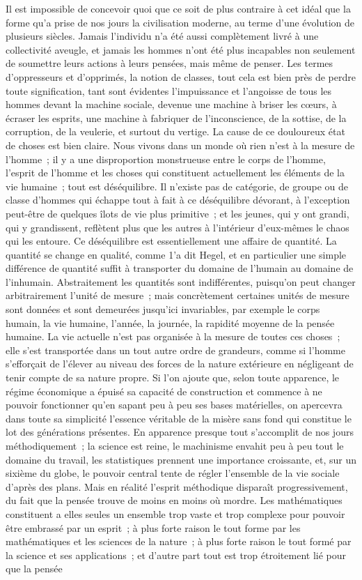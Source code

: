 \documentclass[french,twoside]{book} %
\begin{document}
\noindent Il est impossible de concevoir quoi que ce soit de plus contraire à cet idéal que la forme qu'a prise de nos jours la civilisation moderne, au terme d'une évolution de plusieurs siècles. Jamais l'individu n'a été aussi complètement livré à une collectivité aveugle, et jamais les hommes n'ont été plus incapables non seulement de soumettre leurs actions à leurs pensées, mais même de penser. Les termes d'oppresseurs et d'opprimés, la notion de classes, tout cela est bien près de perdre toute signification, tant sont évidentes l'impuissance et l'angoisse de tous les hommes devant la machine sociale, devenue une machine à briser les cœurs, à écraser les esprits, une machine à fabriquer de l'inconscience, de la sottise, de la corruption, de la veulerie, et surtout du vertige. La cause de ce douloureux état de choses est bien claire. Nous vivons dans un monde où rien n'est à la mesure de l'homme ; il y a une disproportion monstrueuse entre le corps de l'homme, l'esprit de l'homme et les choses qui constituent actuellement les éléments de la vie humaine ; tout est déséquilibre. Il n'existe pas de catégorie, de groupe ou de classe d'hommes qui échappe tout à fait à ce déséquilibre dévorant, à l'exception peut-être de quelques îlots de vie plus primitive ; et les jeunes, qui y ont grandi, qui y grandissent, reflètent plus que les autres à l'intérieur d'eux-mêmes le chaos qui les entoure. Ce déséquilibre est essentiellement une affaire de quantité. La quantité se change en qualité, comme 1’a dit Hegel, et en particulier une simple différence de quantité suffit à transporter du domaine de l'humain au domaine de l'inhumain. Abstraitement les quantités sont indifférentes, puisqu'on peut changer arbitrairement l'unité de mesure ; mais concrètement certaines unités de mesure sont données et sont demeurées jusqu'ici invariables, par exemple le corps humain, la vie humaine, l'année, la journée, la rapidité moyenne de la pensée humaine. La vie actuelle n'est pas organisée à la mesure de toutes ces choses ; elle s'est transportée dans un tout autre ordre de grandeurs, comme si l'homme s'efforçait de l'élever au niveau des forces de la nature extérieure en négligeant de tenir compte de sa nature propre. Si l'on ajoute que, selon toute apparence, le régime économique a épuisé sa capacité de construction et commence à ne pouvoir fonctionner qu'en sapant peu à peu ses bases matérielles, on apercevra dans toute sa simplicité l'essence véritable de la misère sans fond qui constitue le lot des générations présentes. En apparence presque tout s'accomplit de nos jours méthodiquement ; la science est reine, le machinisme envahit peu à peu tout le domaine du travail, les statistiques prennent une importance croissante, et, sur un sixième du globe, le pouvoir central tente de régler l'ensemble de la vie sociale d'après des plans. Mais en réalité l'esprit méthodique disparaît progressivement, du fait que la pensée trouve de moins en moins où mordre. Les mathématiques constituent a elles seules un ensemble trop vaste et trop complexe pour pouvoir être embrassé par un esprit ; à plus forte raison le tout forme par les mathématiques et les sciences de la nature ; à plus forte raison le tout formé par la science et ses applications ; et d'autre part tout est trop étroitement lié pour que la pensée 
\end{document}
